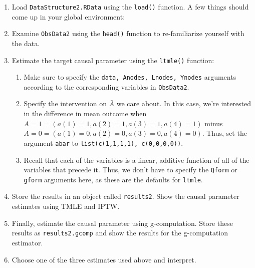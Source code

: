\documentclass{exam}
\newenvironment{packed_item}{
\begin{itemize}
 \setlength{\itemsep}{0pt}
  \setlength{\parskip}{0pt}
  \setlength{\parsep}{0pt}
}{\end{itemize}}
\begin{document}
\begin{enumerate}
\item Load \texttt{DataStructure2.RData} using the \texttt{load()} function. A few things should come up in your global environment:
\item Examine \texttt{ObsData2} using the \texttt{head()} function to re-familiarize yourself with the data.
\item Estimate the target causal parameter using the \texttt{ltmle()} function:
\begin{enumerate}
\item Make sure to specify the \texttt{data, Anodes, Lnodes, Ynodes} arguments according to the corresponding variables in \texttt{ObsData2}. 
\item Specify the intervention on $\bar{A}$ we care about. In this case, we're interested in the difference in mean outcome when $\bar{A} = 1 = (a(1) = 1, a(2) = 1, a(3) = 1, a(4) = 1)$ minus $\bar{A} = 0 = (a(1) = 0, a(2) = 0, a(3) = 0, a(4) = 0)$. Thus, set the argument \texttt{abar} to \texttt{list(c(1,1,1,1), c(0,0,0,0))}.
\item Recall that each of the variables is a linear, additive function of all of the variables that precede it. Thus, we don't have to specify the \texttt{Qform} or \texttt{gform} arguments here, as these are the defaults for \texttt{ltmle}.
\end{enumerate}
\item Store the results in an object called \texttt{results2}. Show the causal parameter estimates using TMLE and IPTW.
\item Finally, estimate the causal parameter using g-computation. Store these results as \texttt{results2.gcomp} and show the results for the g-computation estimator.
\item Choose one of the three estimates used above and interpret.
\end{enumerate}
\end{document}
